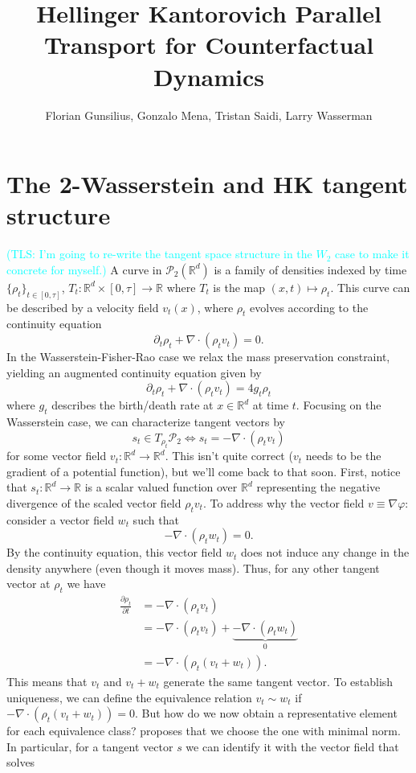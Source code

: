 \documentclass{article}
\title{Hellinger Kantorovich Parallel Transport for Counterfactual Dynamics}
\author{Florian Gunsilius, Gonzalo Mena, Tristan Saidi, Larry Wasserman}
\begin{document}
\maketitle


\section{The 2-Wasserstein and HK tangent structure}
\textcolor{cyan}{(TLS: I'm going to re-write the tangent space structure in the $W_2$ case to make it concrete for myself.)} A curve in $\mathcal{P}_2(\mathbb{R}^d)$ is a family of densities indexed by time $\{\rho_t\}_{t\in [0,\tau]}$, $T_t: \mathbb{R}^d \times [0, \tau] \rightarrow \mathbb{R}$ where $T_t$ is the map $(x,t) \mapsto \rho_t$. This curve can be described by a velocity field $v_t(x)$, where $\rho_t$ evolves according to the continuity equation
\[\partial_t \rho_t  + \nabla \cdot (\rho_tv_t) = 0.\]
In the Wasserstein-Fisher-Rao case we relax the mass preservation constraint, yielding an augmented continuity equation given by
\[\partial_t \rho_t  + \nabla \cdot (\rho_tv_t) = 4g_t\rho_t\]
where $g_t$ describes the birth/death rate at $x \in \mathbb{R}^d$ at time $t$. Focusing on the Wasserstein case, we can characterize tangent vectors by
\[s_t \in T_{\rho_t} \mathcal{P}_2 \iff s_t = -\nabla \cdot (\rho_t v_t)\]
for some vector field $v_t: \mathbb{R}^d \rightarrow \mathbb{R}^d$. This isn't quite correct ($v_t$ needs to be the gradient of a potential function), but we'll come back to that soon. First, notice that $s_t: \mathbb{R}^d \rightarrow \mathbb{R}$ is a scalar valued function over $\mathbb{R}^d$ representing the negative divergence of the scaled vector field $\rho_tv_t$. To address why the vector field $v \equiv \nabla\varphi$: consider a vector field $w_t$ such that 
\[-\nabla \cdot (\rho_t w_t) = 0.\]
By the continuity equation, this vector field $w_t$ does not induce any change in the density anywhere (even though it moves mass). Thus, for any other tangent vector at $\rho_t$ we have 
\begin{align}
    \frac{\partial\rho_t}{\partial t} &= -\nabla \cdot (\rho_tv_t)\\  
    &= -\nabla \cdot (\rho_tv_t) + \underbrace{-\nabla \cdot(\rho_tw_t)}_{0} \\
    &= -\nabla \cdot (\rho_t(v_t +w_t)).
\end{align}
This means that $v_t$ and $v_t + w_t$ generate the same tangent vector. To establish uniqueness, we can define the equivalence relation $v_t \sim w_t$ if $-\nabla \cdot (\rho_t(v_t + w_t)) = 0$. But how do we now obtain a representative element for each equivalence class? \citet{otto2001geometry} proposes that we choose the one with minimal norm. In particular, for a tangent vector $s$ we can identify it with the vector field that solves
\end{document}
